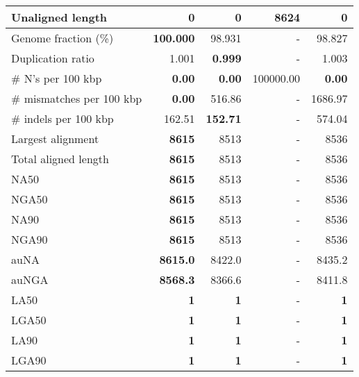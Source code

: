 \documentclass[12pt,a4paper]{article}
\begin{document}
\begin{table}[ht]
\begin{center}
\begin{tabular}{|l*{4}{|r}|}
Unaligned length & {\bf 0} & {\bf 0} & 8624 & {\bf 0} \\ \hline
Genome fraction (\%) & {\bf 100.000} & 98.931 & - & 98.827 \\ \hline
Duplication ratio & 1.001 & {\bf 0.999} & - & 1.003 \\ \hline
\# N's per 100 kbp & {\bf 0.00} & {\bf 0.00} & 100000.00 & {\bf 0.00} \\ \hline
\# mismatches per 100 kbp & {\bf 0.00} & 516.86 & - & 1686.97 \\ \hline
\# indels per 100 kbp & 162.51 & {\bf 152.71} & - & 574.04 \\ \hline
Largest alignment & {\bf 8615} & 8513 & - & 8536 \\ \hline
Total aligned length & {\bf 8615} & 8513 & - & 8536 \\ \hline
NA50 & {\bf 8615} & 8513 & - & 8536 \\ \hline
NGA50 & {\bf 8615} & 8513 & - & 8536 \\ \hline
NA90 & {\bf 8615} & 8513 & - & 8536 \\ \hline
NGA90 & {\bf 8615} & 8513 & - & 8536 \\ \hline
auNA & {\bf 8615.0} & 8422.0 & - & 8435.2 \\ \hline
auNGA & {\bf 8568.3} & 8366.6 & - & 8411.8 \\ \hline
LA50 & {\bf 1} & {\bf 1} & - & {\bf 1} \\ \hline
LGA50 & {\bf 1} & {\bf 1} & - & {\bf 1} \\ \hline
LA90 & {\bf 1} & {\bf 1} & - & {\bf 1} \\ \hline
LGA90 & {\bf 1} & {\bf 1} & - & {\bf 1} \\ \hline
\end{tabular}
\end{center}
\end{table}
\end{document}

